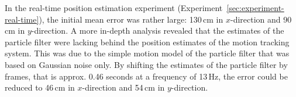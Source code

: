 In the real-time position estimation experiment (Experiment~\ref{sec:experiment-real-time}), the initial mean error was rather large: 130\,cm in $x$-direction and 90\,cm in $y$-direction. A more in-depth analysis revealed that the estimates of the particle filter were lacking behind the position estimates of the motion tracking system. This was due to the simple motion model of the particle filter that was based on Gaussian noise only. By shifting the estimates of the particle filter by frames, that is approx. 0.46 seconds at a frequency of 13\,Hz, the error could be reduced to 46\,cm in $x$-direction and 54\,cm in $y$-direction.  